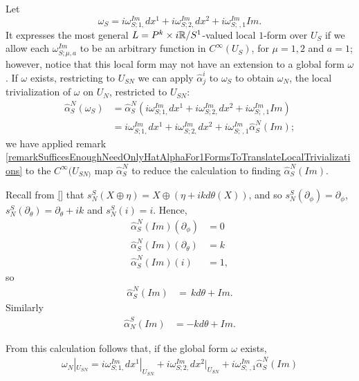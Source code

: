 \begin{example}[$P^k$]
Let
\begin{equation*}
    \omega_S = i\omega^{Im}_{S; 1,} dx^1 + i\omega^{Im}_{S; 2,} dx^2 + i\omega^{Im}_{S; \, ,1} Im.
\end{equation*}
It expresses the most general $L = P^k \times i\mathbb{R}/S^1$-valued local $1$-form over $U_S$ if we allow each $\omega^{Im}_{S; \mu,a}$ to be an arbitrary function in $C^\infty(U_S)$, for $\mu = 1, 2$ and $a = 1$; however, notice that this local form may not have an extension to a global form $\omega$. If $\omega$ exists, restricting to $U_{SN}$ we can apply $\hat \alpha^i_j$ to $\omega_S$ to obtain $\omega_N$, the local trivialization of $\omega$ on $U_N$, restricted to $U_{SN}$:
\begin{align*}
    \hat \alpha^N_S(\omega_S) &= \hat \alpha^N_S(i\omega^{Im}_{S; 1,} dx^1 + i\omega^{Im}_{S; 2,} dx^2 + i\omega^{Im}_{S; \, ,1} Im) \\
        &= i\omega^{Im}_{S; 1,} dx^1 + i\omega^{Im}_{S; 2,} dx^2 + i\omega^{Im}_{S; \, ,1} \hat \alpha^N_S(Im);
\end{align*}
we have applied remark \ref{remarkSufficesEnoughNeedOnlyHatAlphaFor1FormsToTranslateLocalTrivializations} to the $C^\infty(U_{SN)}$ map $\hat \alpha^N_S$ to reduce the calculation to finding $\hat \alpha^N_S(Im)$.

Recall from \ref{} that $s^S_N(X \oplus \eta) = X \oplus (\eta + ik d\theta(X))$, and so $s^S_N(\partial_\phi) = \partial_\phi$, $s^S_N(\partial_\theta) = \partial_\theta + ik$ and $s^S_N(i) = i$. Hence,
\begin{align}
    \hat \alpha^N_S(Im)(\partial_\phi) &= 0 \\
    \hat \alpha^N_S(Im)(\partial_\theta) &= k \\
    \hat \alpha^N_S(Im)(i) &= 1,
\end{align}
so
\begin{align}
    \hat \alpha^N_S(Im) &= \,k d\theta + Im.
\end{align} Similarly
\begin{align}
    \hat \alpha^S_N(Im) &= -k d\theta + Im.
\end{align}

From this calculation follows that, if the global form $\omega$ exists,
\begin{align*}
    \omega_N|_{U_{SN}} = i\omega^{Im}_{S; 1,} dx^1|_{U_{SN}} + i\omega^{Im}_{S; 2,} dx^2|_{U_{SN}} + i\omega^{Im}_{S; \, ,1} \hat \alpha^N_S(Im)
\end{align*}



\end{example}
